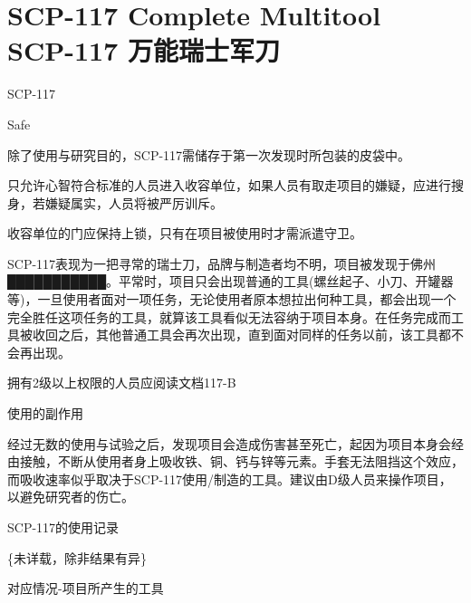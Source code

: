 \chapter[SCP-117 万能瑞士军刀]{
    SCP-117 Complete Multitool\\
    SCP-117 万能瑞士军刀
}

\label{chap:SCP-117}

SCP-117

Safe

除了使用与研究目的，SCP-117需储存于第一次发现时所包装的皮袋中。

只允许心智符合标准的人员进入收容单位，如果人员有取走项目的嫌疑，应进行搜身，若嫌疑属实，人员将被严厉训斥。

收容单位的门应保持上锁，只有在项目被使用时才需派遣守卫。

SCP-117表现为一把寻常的瑞士刀，品牌与制造者均不明，项目被发现于佛州███████████。平常时，项目只会出现普通的工具(螺丝起子、小刀、开罐器等)，一旦使用者面对一项任务，无论使用者原本想拉出何种工具，都会出现一个完全胜任这项任务的工具，就算该工具看似无法容纳于项目本身。在任务完成而工具被收回之后，其他普通工具会再次出现，直到面对同样的任务以前，该工具都不会再出现。

拥有2级以上权限的人员应阅读文档117-B

使用的副作用

经过无数的使用与试验之后，发现项目会造成伤害甚至死亡，起因为项目本身会经由接触，不断从使用者身上吸收铁、铜、钙与锌等元素。手套无法阻挡这个效应，而吸收速率似乎取决于SCP-117使用\slash 制造的工具。建议由D级人员来操作项目，以避免研究者的伤亡。

SCP-117的使用记录

\{未详载，除非结果有异\}

对应情况-项目所产生的工具

